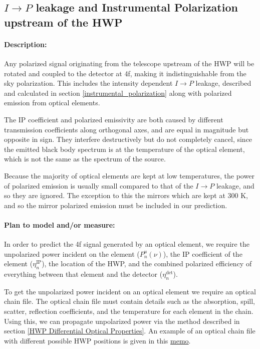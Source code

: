 
\subsection{$I\rightarrow P$ leakage and Instrumental Polarization upstream of the HWP}
\label{IP upstream of HWP}

\paragraph{Description:}
Any polarized signal originating from the telescope upstream of the HWP will be rotated and coupled to the detector at 4f,
making it indistinguishable from the sky polarization.
This includes the intensity dependent $I\rightarrow P$ leakage, 
described and calculated in section \ref{instrumental_polarization} 
along with polarized emission from optical elements. 

The IP coefficient and polarized emissivity are both caused by different transmission coefficients along orthogonal axes,
and are equal in magnitude but opposite in sign.
They interfere destructively but do not completely cancel, since the emitted black body spectrum is at the temperature
of the optical element, which is not the same as the spectrum of the source.

Because the majority of optical elements are kept at low temperatures, 
the power of polarized emission is usually small compared to that of the $I\rightarrow P$ leakage, and so they are ignored.
The exception to this the mirrors which are kept at 300 K, and so the mirror polarized emission must be included in our prediction.

\paragraph{Plan to model and/or measure:}
In order to predict the 4f signal generated by an optical element, 
we require the unpolarized power incident on the element ($P^u_n(\nu)$), the IP coefficient of the element 
($\eta_n^\text{IP}$), the location of the HWP,
and the combined polarized efficiency of everything between that element and the detector ($\eta_n^\text{det}$).

To get the unpolarized power incident on an optical element we require an optical chain file.
The optical chain file must contain details such as the absorption, spill, scatter, reflection coefficients, and 
the temperature for each element in the chain.
Using this, we can propagate unpolarized power via the method described in section \ref{HWP Differential Optical Properties}. 
An example of an optical chain file with different possible HWP positions is given in this 
\href{http://simonsobservatory.wdfiles.com/local--files/calandsys-telecon/eb_leakage_from_pointing_error.pdf?ukey=61f26ef33e8439a4e7096ab52c54c523066a4e35}{memo}.

